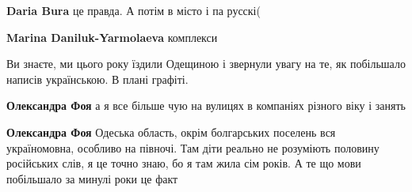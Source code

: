 \begin{itemize}
\begin{itemize}
 

\textbf{Daria Bura} це правда. А потім в місто і па русскі(

 
\textbf{Marina Daniluk-Yarmolaeva} комплекси
\end{itemize}

 
Ви знаєте, ми цього року їздили Одещиною і звернули увагу на те, як побільшало
написів українською. В плані графіті.

\begin{itemize}
 

\textbf{Олександра Фоя} а я все більше чую на вулицях в компаніях різного віку і занять

 
\textbf{Олександра Фоя} Одеська область, окрім болгарських поселень вся україномовна, особливо на півночі. Там діти реально не розуміють половину російських слів, я це точно знаю, бо я там жила сім років. А те що мови побільшало за минулі роки це факт

 

\end{itemize}
\end{itemize}
